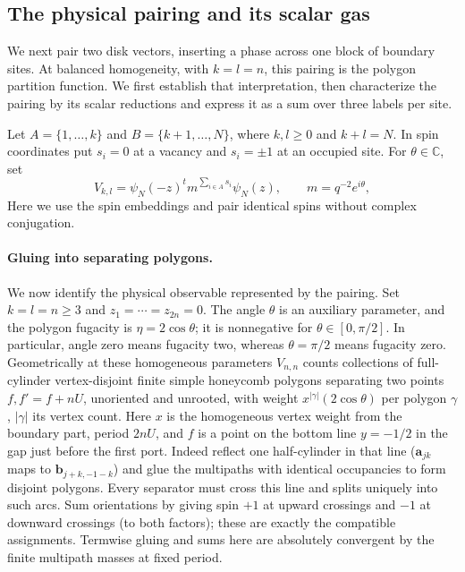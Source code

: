 \subsection{The physical pairing and its scalar gas}
\label{c2:sec-scalar-gas}

We next pair two disk vectors, inserting a phase across one block of
boundary sites. At balanced homogeneity, with \(k=l=n\), this pairing is the
polygon partition function. We first establish that interpretation, then characterize the
pairing by its scalar reductions and express it as a sum over three
labels per site.

Let \(A=\{1,\ldots,k\}\) and \(B=\{k+1,\ldots,N\}\), where
\(k,l\ge0\) and \(k+l=N\). In spin coordinates put \(s_i=0\) at a vacancy
and \(s_i=\pm1\) at an occupied site. For \(\theta\in\mathbb C\), set
\[
 V_{k,l}=\psi_N(-z)^t m^{\sum_{i\in A}s_i}\psi_N(z),\qquad m=q^{-2} e^{i\theta},
\]
Here we use the spin embeddings and pair identical spins without
complex conjugation.

\paragraph{Gluing into separating polygons.}\label{sec:pd:physical-pairing}
We now identify the physical observable represented by the pairing. Set \(k=l=n\ge3\) and \(z_1=\cdots=z_{2n}=0\).
The angle \(\theta\) is an auxiliary parameter, and the polygon fugacity
is \(\eta=2\cos\theta\); it is nonnegative for
\(\theta\in[0,\pi/2]\). In particular, angle zero means fugacity two,
whereas \(\theta=\pi/2\) means fugacity zero.
Geometrically at these homogeneous parameters \(V_{n,n}\) counts collections of full-cylinder vertex-disjoint finite simple honeycomb polygons separating two points \(f,f'=f+nU\), unoriented and unrooted, with weight \(x^{|\gamma|}(2\cos\theta)\) per polygon \(\gamma\), \(|\gamma|\) its vertex count. Here \(x\) is the homogeneous vertex weight from the boundary part, period \(2nU\), and \(f\) is a point on the bottom line \(y=-1/2\) in the gap just before the first port. Indeed reflect one half-cylinder in that line (\(\mathbf a_{jk}\) maps to \(\mathbf b_{j+k,-1-k}\)) and glue the multipaths with identical occupancies to form disjoint polygons. Every separator must cross this line and splits uniquely into such arcs. Sum orientations by giving spin \(+1\) at upward crossings and \(-1\) at downward crossings (to both factors); these are exactly the compatible assignments. Termwise gluing and sums here are absolutely convergent by the finite multipath masses at fixed period.

